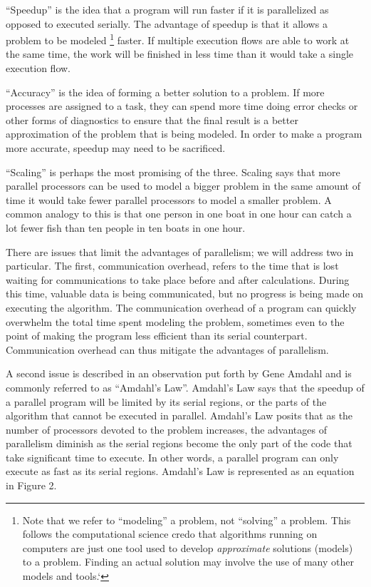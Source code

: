 \documentclass[letterpaper,10pt,openany,oneside]{sphinxmanual}
\begin{document}
“Speedup” is the idea that a program will run faster if it is
parallelized as opposed to executed serially. The advantage of speedup
is that it allows a problem to be modeled \footnote{
Note that we refer to ``modeling'' a problem, not ``solving'' a problem. This follows the computational science credo that algorithms running on computers are just one tool used to develop \emph{approximate} solutions (models) to a problem. Finding an actual solution may involve the use of many other models and tools.{}`
} faster. If multiple
execution flows are able to work at the same time, the work will be
finished in less time than it would take a single execution flow.

“Accuracy” is the idea of forming a better solution to a problem. If
more processes are assigned to a task, they can spend more time doing
error checks or other forms of diagnostics to ensure that the final
result is a better approximation of the problem that is being modeled.
In order to make a program more accurate, speedup may need to be
sacrificed.

“Scaling” is perhaps the most promising of the three. Scaling says that
more parallel processors can be used to model a bigger problem in the
same amount of time it would take fewer parallel processors to model a
smaller problem. A common analogy to this is that one person in one boat
in one hour can catch a lot fewer fish than ten people in ten boats in
one hour.

There are issues that limit the advantages of parallelism; we will
address two in particular. The first, communication overhead, refers to
the time that is lost waiting for communications to take place before
and after calculations. During this time, valuable data is being
communicated, but no progress is being made on executing the algorithm.
The communication overhead of a program can quickly overwhelm the total
time spent modeling the problem, sometimes even to the point of making
the program less efficient than its serial counterpart. Communication
overhead can thus mitigate the advantages of parallelism.

A second issue is described in an observation put forth by Gene Amdahl
and is commonly referred to as “Amdahl’s Law”. Amdahl’s Law says that
the speedup of a parallel program will be limited by its serial regions,
or the parts of the algorithm that cannot be executed in parallel.
Amdahl’s Law posits that as the number of processors devoted to the
problem increases, the advantages of parallelism diminish as the serial
regions become the only part of the code that take significant time to
execute. In other words, a parallel program can only execute as fast as
its serial regions. Amdahl’s Law is represented as an equation in Figure
2.
\end{document}
